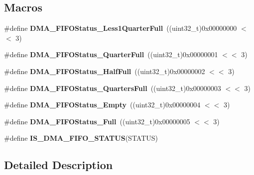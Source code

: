 \subsection*{Macros}
\begin{DoxyCompactItemize}
\item 
\mbox{\label{group___d_m_a__fifo__status__level_gace4b567c96b1c95618a4894875d8123b}} 
\#define {\bfseries D\+M\+A\+\_\+\+F\+I\+F\+O\+Status\+\_\+\+Less1\+Quarter\+Full}~((uint32\+\_\+t)0x00000000 $<$$<$ 3)
\item 
\mbox{\label{group___d_m_a__fifo__status__level_ga258d41ce51005eea1c5a69fcf07d8e42}} 
\#define {\bfseries D\+M\+A\+\_\+\+F\+I\+F\+O\+Status\+\_\+Quarter\+Full}~((uint32\+\_\+t)0x00000001 $<$$<$ 3)
\item 
\mbox{\label{group___d_m_a__fifo__status__level_ga0dd0faeb4ac9de3dbdcd7ca6dd5bb9e4}} 
\#define {\bfseries D\+M\+A\+\_\+\+F\+I\+F\+O\+Status\+\_\+\+Half\+Full}~((uint32\+\_\+t)0x00000002 $<$$<$ 3)
\item 
\mbox{\label{group___d_m_a__fifo__status__level_ga418c64b77f903c558471d22eeabde439}} 
\#define {\bfseries D\+M\+A\+\_\+\+F\+I\+F\+O\+Status\+\_\+Quarters\+Full}~((uint32\+\_\+t)0x00000003 $<$$<$ 3)
\item 
\mbox{\label{group___d_m_a__fifo__status__level_gaacba9ad22e39ed92d2b4ae9ebece654c}} 
\#define {\bfseries D\+M\+A\+\_\+\+F\+I\+F\+O\+Status\+\_\+\+Empty}~((uint32\+\_\+t)0x00000004 $<$$<$ 3)
\item 
\mbox{\label{group___d_m_a__fifo__status__level_gaf7ea7373a08730e773cbc048c9965dc2}} 
\#define {\bfseries D\+M\+A\+\_\+\+F\+I\+F\+O\+Status\+\_\+\+Full}~((uint32\+\_\+t)0x00000005 $<$$<$ 3)
\item 
\#define {\bfseries I\+S\+\_\+\+D\+M\+A\+\_\+\+F\+I\+F\+O\+\_\+\+S\+T\+A\+T\+US}(S\+T\+A\+T\+US)
\end{DoxyCompactItemize}


\subsection{Detailed Description}


